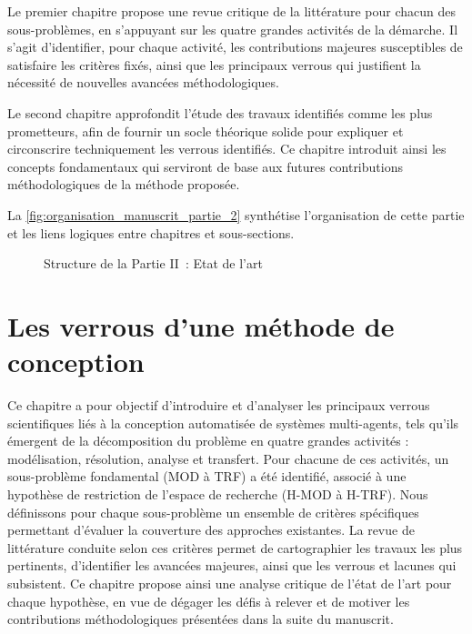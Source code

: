 Le premier chapitre propose une revue critique de la littérature pour chacun des sous-problèmes, en s’appuyant sur les quatre grandes activités de la démarche. Il s’agit d’identifier, pour chaque activité, les contributions majeures susceptibles de satisfaire les critères fixés, ainsi que les principaux verrous qui justifient la nécessité de nouvelles avancées méthodologiques.

Le second chapitre approfondit l’étude des travaux identifiés comme les plus prometteurs, afin de fournir un socle théorique solide pour expliquer et circonscrire techniquement les verrous identifiés. Ce chapitre introduit ainsi les concepts fondamentaux qui serviront de base aux futures contributions méthodologiques de la méthode proposée.

La \autoref{fig:organisation_manuscrit_partie_2} synthétise l’organisation de cette partie et les liens logiques entre chapitres et sous-sections.


\begin{figure}[h!]
  \centering
  \resizebox{\textwidth}{!}{%
    
  }
  \caption{Structure de la Partie II~: Etat de l'art}
  \label{fig:organisation_manuscrit_partie_2}
\end{figure}

\clearpage
\thispagestyle{empty}
\null
\newpage


\chapter{Les verrous d'une méthode de conception}
\label{chap:verrous}

\noindent
Ce chapitre a pour objectif d’introduire et d’analyser les principaux verrous scientifiques liés à la conception automatisée de systèmes multi-agents, tels qu’ils émergent de la décomposition du problème en quatre grandes activités : modélisation, résolution, analyse et transfert. Pour chacune de ces activités, un sous-problème fondamental (MOD à TRF) a été identifié, associé à une hypothèse de restriction de l’espace de recherche (H-MOD à H-TRF). Nous définissons pour chaque sous-problème un ensemble de critères spécifiques permettant d’évaluer la couverture des approches existantes. La revue de littérature conduite selon ces critères permet de cartographier les travaux les plus pertinents, d’identifier les avancées majeures, ainsi que les verrous et lacunes qui subsistent. Ce chapitre propose ainsi une analyse critique de l’état de l’art pour chaque hypothèse, en vue de dégager les défis à relever et de motiver les contributions méthodologiques présentées dans la suite du manuscrit.

